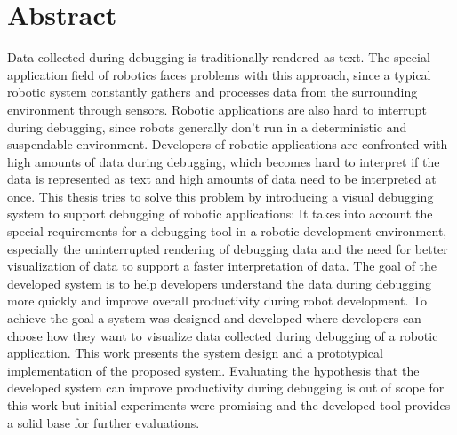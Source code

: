 \documentclass[12pt,a4paper,headsepline,footsepline,DIV13,BCOR12mm]{scrbook}
\newcommand{\todo}[1]{{\color{red}{\hl{TODO: #1...}}}}
\begin{document}
\chapter*{Abstract}
Data collected during debugging is traditionally rendered as text. The special application field of robotics faces problems with this approach, since a typical robotic system constantly gathers and processes data from the surrounding environment through sensors. Robotic applications are also hard to interrupt during debugging, since robots generally don't run in a deterministic and suspendable environment. Developers of robotic applications are confronted with high amounts of data during debugging, which becomes hard to interpret if the data is represented as text and high amounts of data need to be interpreted at once. This thesis tries to solve this problem by introducing a visual debugging system to support debugging of robotic applications: It takes into account the special requirements for a debugging tool in a robotic development environment, especially the uninterrupted rendering of debugging data and the need for better visualization of data to support a faster interpretation of data. The goal of the developed system is to help developers understand the data during debugging more quickly and improve overall productivity during robot development. To achieve the goal a system was designed and developed where developers can choose how they want to visualize data collected during debugging of a robotic application. This work presents the system design and a prototypical implementation of the proposed system. Evaluating the hypothesis that the developed system can improve productivity during debugging is out of scope for this work but initial experiments were promising and the developed tool provides a solid base for further evaluations.
\newpage
{\huge \todo{abstract deutsch????}}
\newpage
\tableofcontents
\newpage
\listoffigures
\newpage
\lstlistoflistings











\appendix

\end{document}
